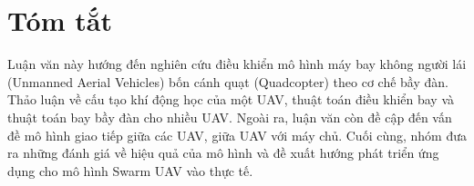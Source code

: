 \cleardoublepage
\chapter*{Tóm tắt}
\vspace{1.0cm}
Luận văn này hướng đến nghiên cứu điều khiển mô hình máy bay không người lái (Unmanned Aerial Vehicles) bốn cánh quạt (Quadcopter) theo cơ chế bầy đàn. Thảo luận về cấu tạo khí động học của một UAV, thuật toán điều khiển bay và thuật toán bay bầy đàn cho nhiều UAV. Ngoài ra, luận văn còn đề cập đến vấn đề mô hình giao tiếp giữa các UAV, giữa UAV với máy chủ. Cuối cùng, nhóm đưa ra những đánh giá về hiệu quả của mô hình và đề xuất hướng phát triển ứng dụng cho mô hình Swarm UAV vào thực tế.
\vskip0.5cm


